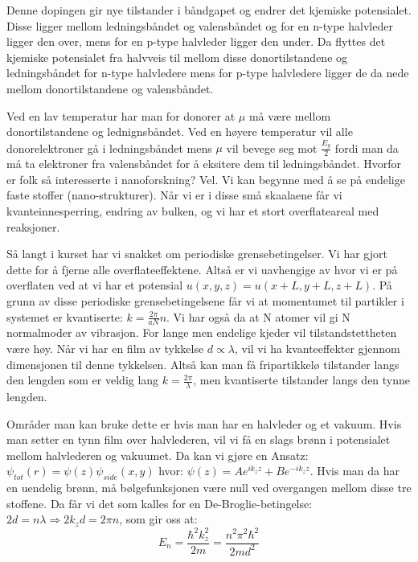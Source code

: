 \documentclass{article}
\begin{document}
Denne dopingen gir nye tilstander i båndgapet og endrer det kjemiske potensialet. Disse ligger mellom ledningsbåndet og valensbåndet og for en n-type halvleder ligger den over, mens for en p-type halvleder ligger den under. Da flyttes det kjemiske potensialet fra halvveis til mellom disse donortilstandene og ledningsbåndet for n-type halvledere mens for p-type halvledere ligger de da nede mellom donortilstandene og  valensbåndet.

Ved en lav temperatur har man for donorer at $\mu$ må være mellom donortilstandene og lednignsbåndet. Ved en høyere temperatur vil alle donorelektroner gå i ledningsbåndet mens $\mu$ vil bevege seg mot $\frac{E_g}{2}$ fordi man da må ta elektroner fra valensbåndet for å eksitere dem til ledningsbåndet.
Hvorfor er  folk så interesserte i nanoforskning? Vel. Vi kan begynne med å se på endelige faste stoffer (nano-strukturer). Når vi er i disse små skaalaene får vi kvanteinnesperring, endring av bulken, og vi har et stort overflateareal med reaksjoner.

Så langt i kurset har vi snakket om periodiske grensebetingelser. Vi har gjort dette for å fjerne alle overflateeffektene. Altså er vi uavhengige av hvor vi er på overflaten ved at vi har et potensial $u(x,y,z)=u(x+L,y+L,z+L)$. På grunn av disse periodiske grensebetingelsene får vi at momentumet til partikler i systemet er kvantiserte: $k = \frac{2 \pi}{a N} n$. Vi har også da at N atomer vil gi N normalmoder av vibrasjon. For lange men endelige kjeder vil tilstandstettheten være høy. Når vi har en film av tykkelse $d \propto \lambda$, vil vi ha kvanteeffekter gjennom dimensjonen til denne tykkelsen. Altså kan man få fripartikkelø tilstander langs den lengden som er veldig lang $k = \frac{2\pi}{\lambda}$, men kvantiserte tilstander langs den tynne lengden.

Områder man kan bruke dette er hvis man har en halvleder og et vakuum. Hvis man setter en tynn film over halvlederen, vil vi få en slags brønn i potensialet mellom halvlederen og vakuumet. Da kan vi gjøre en Ansatz: $\psi_{tot}(r) = \psi(z) \psi_{side}(x,y)$ hvor: $\psi(z) = Ae^{ik_z z}+Be^{-ik_z z}$. Hvis man da har en uendelig brønn, må bølgefunksjonen være null ved overgangen mellom disse tre stoffene. Da får vi det som kalles for en De-Broglie-betingelse: $2d = n\lambda \Rightarrow 2k_z d = 2\pi n$, som gir oss at:
\begin{equation}
  E_n = \frac{\hbar^2 k_z^2}{2m} = \frac{n^2 \pi^2 \hbar^2}{2m d^2}
\end{equation}
\end{document}
